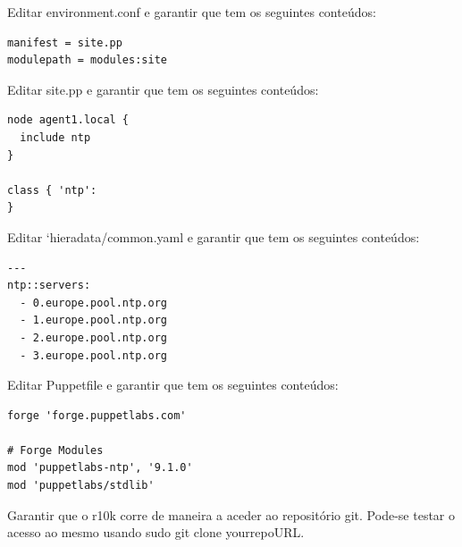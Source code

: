 \documentclass{article}
\begin{document}
Editar environment.conf e garantir que tem os seguintes conteúdos:
\begin{lstlisting}
manifest = site.pp
modulepath = modules:site
\end{lstlisting}

Editar site.pp e garantir que tem os seguintes conteúdos:
\begin{lstlisting}
node agent1.local {
  include ntp
}

class { 'ntp':
}
\end{lstlisting}

Editar `hieradata/common.yaml e garantir que tem os seguintes conteúdos:
\begin{lstlisting}
---
ntp::servers:
  - 0.europe.pool.ntp.org
  - 1.europe.pool.ntp.org
  - 2.europe.pool.ntp.org
  - 3.europe.pool.ntp.org
\end{lstlisting}

Editar Puppetfile e garantir que tem os seguintes conteúdos:
\begin{lstlisting}
forge 'forge.puppetlabs.com'

# Forge Modules
mod 'puppetlabs-ntp', '9.1.0'
mod 'puppetlabs/stdlib'
\end{lstlisting}

Garantir que o r10k corre de maneira a aceder ao repositório git. Pode-se testar o acesso ao mesmo usando sudo git clone yourrepoURL.
\end{document}

